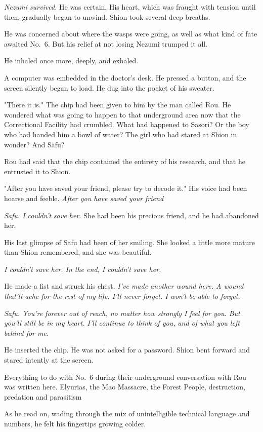 \emph{Nezumi survived.} He was certain. His heart, which was fraught with
tension until then, gradually began to unwind. Shion took several deep
breaths.

He was concerned about where the wasps were going, as well as what kind
of fate awaited No.~6. But his relief at not losing Nezumi trumped it
all.

He inhaled once more, deeply, and exhaled.

A computer was embedded in the doctor's desk. He pressed a button, and
the screen silently began to load. He dug into the pocket of his
sweater.

"There it is." The chip had been given to him by the man called Rou. He
wondered what was going to happen to that underground area now that the
Correctional Facility had crumbled. What had happened to Sasori? Or the
boy who had handed him a bowl of water? The girl who had stared at Shion
in wonder? And Safu?

Rou had said that the chip contained the entirety of his research, and
that he entrusted it to Shion.

"After you have saved your friend, please try to decode it." His voice
had been hoarse and feeble. \emph{After you have saved your friend\el }

\emph{Safu. I couldn't save her.} She had been his precious friend, and he had
abandoned her.

His last glimpse of Safu had been of her smiling. She looked a little
more mature than Shion remembered, and she was beautiful.

\emph{I couldn't save her. In the end, I couldn't save her.}

He made a fist and struck his chest. \emph{I've made another wound here. A
wound that'll ache for the rest of my life. I'll never forget. I won't
be able to forget.}

\emph{Safu. You're forever out of reach, no matter how strongly I feel for
you. But you'll still be in my heart. I'll continue to think of you, and
of what you left behind for me.}

He inserted the chip. He was not asked for a password. Shion bent
forward and stared intently at the screen.

Everything to do with No.~6 during their underground conversation with
Rou was written here. Elyurias, the Mao Massacre, the Forest People,
destruction, predation and parasitism\el 

As he read on, wading through the mix of unintelligible technical
language and numbers, he felt his fingertips growing colder.

